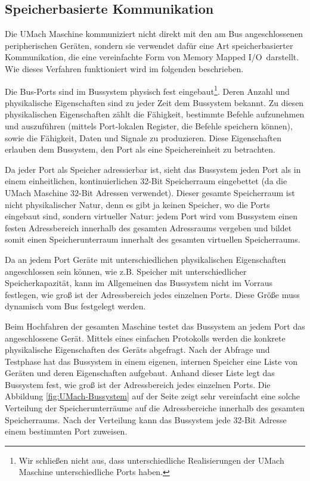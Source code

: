 \subsection{Speicherbasierte Kommunikation}

Die UMach Maschine kommuniziert nicht direkt mit den am Bus angeschlossenen
peripherischen Geräten, sondern sie verwendet dafür eine Art speicherbasierter
Kommunikation, die eine vereinfachte Form von \glqq Memory Mapped I/O\grqq\
darstellt. Wie dieses Verfahren funktioniert wird im
folgenden beschrieben.

Die Bus-Ports sind im Bussystem physisch fest
eingebaut\footnote{Wir schließen nicht aus, dass unterschiedliche Realisierungen
der UMach Maschine unterschiedliche Ports haben.}. Deren Anzahl und
physikalische Eigenschaften sind zu jeder Zeit dem Bussystem bekannt. Zu diesen
physikalischen Eigenschaften zählt die Fähigkeit, bestimmte Befehle aufzunehmen
und auszuführen (mittels Port-lokalen Register, die Befehle speichern können),
sowie die Fähigkeit, Daten und Signale zu produzieren. Diese Eigenschaften
erlauben dem Bussystem, den Port als eine Speichereinheit zu betrachten. 

Da jeder Port als Speicher adressierbar ist, sieht das Bussystem jeden Port als
in einem einheitlichen, kontinuierlichen 32-Bit Speicherraum eingebettet (da
die UMach Maschine 32-Bit Adressen verwendet). Dieser gesamte Speicherraum ist
nicht physikalischer Natur, denn es gibt ja keinen Speicher, wo die Ports
eingebaut sind, sondern virtueller Natur: jedem Port wird vom Bussystem einen
festen Adressbereich innerhalb des gesamten Adressraums vergeben und bildet
somit einen Speicherunterraum\index{Speicherunterraum} innerhalt des gesamten
virtuellen Speicherraums.

Da an jedem Port Geräte mit unterschiedlichen physikalischen Eigenschaften
angeschlossen sein können, wie z.B. Speicher mit unterschiedlicher
Speicherkapazität, kann im Allgemeinen das Bussystem nicht im Vorraus festlegen,
wie groß ist der Adressbereich jedes einzelnen Ports. Diese Größe muss dynamisch
vom Bus festgelegt werden.

Beim Hochfahren der gesamten Maschine testet das Bussystem an jedem Port das
angeschlossene Gerät. Mittels eines einfachen Protokolls werden die konkrete
physikalische Eigenschaften des Geräts abgefragt. Nach der Abfrage und Testphase
hat das Bussystem in einem eigenen, internen Speicher eine Liste von Geräten und
deren Eigenschaften aufgebaut. Anhand dieser Liste legt das Bussystem fest, wie
groß ist der Adressbereich jedes einzelnen Ports. Die Abbildung
\ref{fig:UMach-Bussystem} auf der Seite \pageref{fig:UMach-Bussystem} zeigt sehr
vereinfacht eine solche Verteilung der Speicherunterräume auf die Adressbereiche
innerhalb des gesamten Speicherraums. Nach der Verteilung kann das Bussystem
jede 32-Bit Adresse einem bestimmten Port zuweisen.



